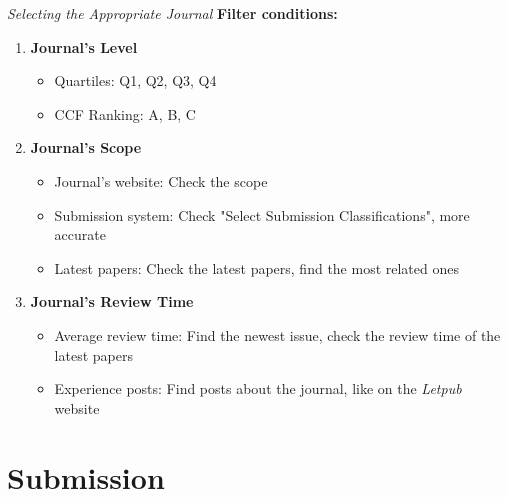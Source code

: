 \documentclass{beamer}
\begin{document}
\begin{frame}{\textit{Selecting the Appropriate Journal}}
    \textbf{Filter conditions:}
    \begin{enumerate}
        \item \textbf{Journal's Level}
              \begin{itemize}
                  \item Quartiles: Q1, Q2, Q3, Q4
                  \item CCF Ranking: A, B, C
              \end{itemize}
        \item \textbf{Journal's Scope}
              \begin{itemize}
                  \item Journal's website: Check the scope
                  \item Submission system: Check "Select Submission Classifications", more accurate
                  \item Latest papers: Check the latest papers, find the most related ones
              \end{itemize}
        \item \textbf{Journal's Review Time}
              \begin{itemize}
                  \item Average review time: Find the newest issue, check the review time of the latest papers
                  \item Experience posts: Find posts about the journal, like on the \textit{Letpub} website
              \end{itemize}

    \end{enumerate}
\end{frame}

\section{Submission}
\end{document}
